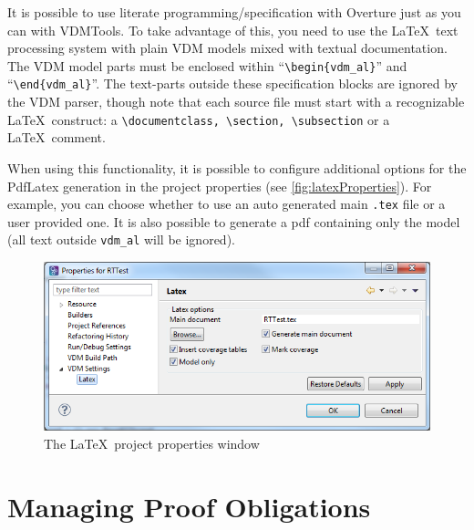\documentclass{overturerepchap}
\begin{document}
It is possible to use literate programming/specification \cite{Johnson96} with
Overture just as you can with VDMTools. To take advantage of this,
you need to use the \LaTeX\ text processing system with
plain VDM models mixed with textual documentation.  The VDM model parts must be
enclosed within ``\verb+\begin{vdm_al}+'' and ``\verb+\end{vdm_al}+''. The
text-parts outside these specification blocks are ignored by the VDM parser,
though note that each source file must start with a recognizable \LaTeX\
construct: a \verb+\documentclass, \section, \subsection+ or a \LaTeX\ comment.

When using this functionality, it is possible to configure additional options
for the PdfLatex generation in the project properties (see
\autoref{fig:latexProperties}). For example, you can choose whether to use an
auto generated main \texttt{.tex} file or a user provided one.  It is also possible to
generate a pdf containing only the model (all text outside \texttt{vdm\_al}
will be ignored).

\begin{figure}[!htb]
\begin{center}
  \includegraphics[width=\textwidth]{screenDumps/latex_properties}
  \caption{The \LaTeX\ project properties window}
  \label{fig:latexProperties}
\end{center}
\end{figure}


\chapter{Managing Proof Obligations}\label{sec:POmanagement}
\end{document}
